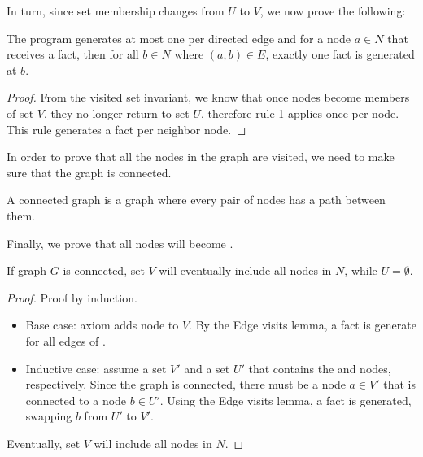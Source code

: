 In turn, since set membership changes from $U$ to $V$, we now prove the
following:

\begin{lemma}
The program generates at most one  per directed edge and for a node
$a \in N$ that receives a  fact, then for all $b \in N$ where $(a,
b) \in E$, exactly one  fact is generated at $b$.
\end{lemma}
\begin{proof}
From the visited set invariant, we know that once nodes become members of set $V$,
they no longer return to set $U$, therefore rule 1 applies once per
node. This rule generates a  fact per neighbor node.
\end{proof}

In order to prove that all the nodes in the graph are visited, we need to make
sure that the graph is connected.

\begin{definition}
A connected graph is a graph where every pair of nodes has a path between them.
\end{definition}

Finally, we prove that all nodes will become .

\begin{theorem}
If graph $G$ is connected, set $V$ will eventually include all nodes in $N$,
while $U = \emptyset$.
\end{theorem}
\begin{proof}
Proof by induction.

\begin{itemize}
   \item Base case: axiom  adds node  to $V$. By
   the Edge visits lemma, a  fact is generate for all edges of
   .
   \item Inductive case: assume a set $V'$ and a set $U'$ that contains the
    and  nodes, respectively. Since the graph
   is connected, there must be a node $a \in V'$ that is connected to a node $b
   \in U'$. Using the Edge visits lemma, a  fact is generated,
   swapping $b$ from $U'$ to $V'$.
\end{itemize}

Eventually, set $V$ will include all nodes in $N$.
\end{proof}

